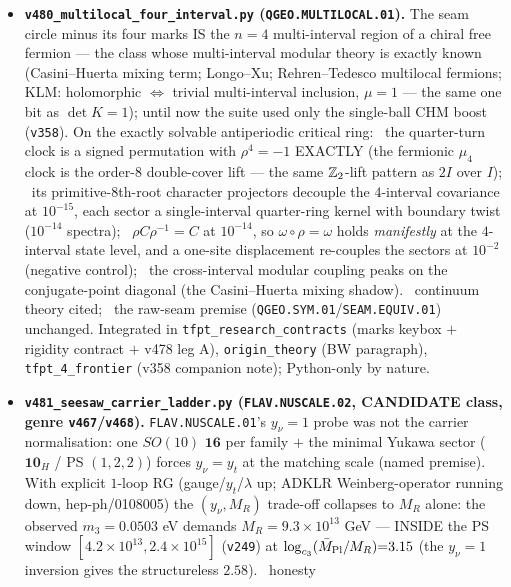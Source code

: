 \begin{itemize}[leftmargin=1.5em]
vector over $\Z$, $\sum\delta_i^2{=}120{=}4\cdot30$, $30{=}2\cdot3\cdot5$, dimension count $=4$;
lake build clean, \texttt{\#print axioms} $=$ the three standard kernel axioms only).
\item \textbf{\texttt{v480\_multilocal\_four\_interval.py} (\texttt{QGEO.MULTILOCAL.01}).} The seam circle
minus its four marks IS the $n{=}4$ multi-interval region of a chiral free fermion --- the class whose
multi-interval modular theory is exactly known (Casini--Huerta mixing term; Longo--Xu; Rehren--Tedesco
multilocal fermions; KLM: holomorphic $\Leftrightarrow$ trivial multi-interval inclusion, $\mu{=}1$ ---
the same one bit as $\det K{=}1$); until now the suite used only the single-ball CHM boost (\texttt{v358}).
On the exactly solvable antiperiodic critical ring: \mE\ the quarter-turn clock is a signed permutation
with $\rho^4{=}{-}1$ EXACTLY (the fermionic $\mu_4$ clock is the order-$8$ double-cover lift --- the same
$\mathbb{Z}_2$-lift pattern as $2I$ over $I$); \mE\ its primitive-$8$th-root character projectors decouple the
$4$-interval covariance at $10^{-15}$, each sector a single-interval quarter-ring kernel with boundary
twist ($10^{-14}$ spectra); \mE\ $\rho C\rho^{-1}{=}C$ at $10^{-14}$, so $\omega\circ\rho{=}\omega$ holds
\emph{manifestly} at the $4$-interval state level, and a one-site displacement re-couples the sectors at
$10^{-2}$ (negative control); \mE\ the cross-interval modular coupling peaks on the conjugate-point
diagonal (the Casini--Huerta mixing shadow). \mC\ continuum theory cited; \mO\ the raw-seam premise
(\texttt{QGEO.SYM.01}/\texttt{SEAM.EQUIV.01}) unchanged. Integrated in \texttt{tfpt\_research\_contracts}
(marks keybox $+$ rigidity contract $+$ v478 leg A), \texttt{origin\_theory} (BW paragraph),
\texttt{tfpt\_4\_frontier} (v358 companion note); Python-only by nature.
\item \textbf{\texttt{v481\_seesaw\_carrier\_ladder.py} (\texttt{FLAV.NUSCALE.02}, CANDIDATE class, genre
\texttt{v467}/\texttt{v468}).} \texttt{FLAV.NUSCALE.01}'s $y_\nu{=}1$ probe was not the carrier
normalisation: one $SO(10)$ $\mathbf{16}$ per family $+$ the minimal Yukawa sector ($\mathbf{10}_H$ / PS
$(1,2,2)$) forces $y_\nu{=}y_t$ at the matching scale (named premise). With explicit $1$-loop RG
(gauge/$y_t$/$\lambda$ up; ADKLR Weinberg-operator running down, hep-ph/0108005) the $(y_\nu,M_R)$
trade-off collapses to $M_R$ alone: the observed $m_3{=}0.0503$ eV demands $M_R{=}9.3{\times}10^{13}$ GeV
--- INSIDE the PS window $[4.2{\times}10^{13},2.4{\times}10^{15}]$ (\texttt{v249}) at
$\log_{c_3}(\bar M_{\mathrm{Pl}}/M_R){=}3.15$ (the $y_\nu{=}1$ inversion gives the structureless $2.58$). \mX\ honesty

\end{itemize}
